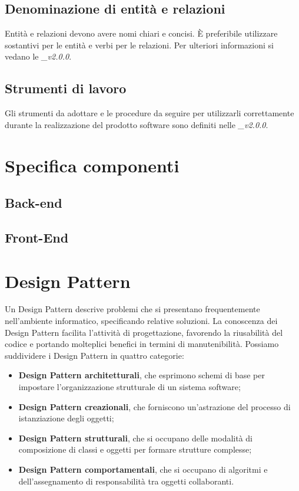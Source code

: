 \documentclass[12pt,a4paper]{article}
\begin{document}

\subsection{Denominazione di entità e relazioni}
Entità e relazioni devono avere nomi chiari e concisi. È preferibile utilizzare sostantivi
per le entità e verbi per le relazioni. Per ulteriori informazioni si vedano
le \textit{\NdP\_v2.0.0}.

\subsection{Strumenti di lavoro}
Gli strumenti da adottare e le procedure da seguire per utilizzarli correttamente durante la realizzazione 
del prodotto software sono definiti nelle \textit{\NdP\_v2.0.0}.

\newpage
\section{Specifica componenti}

\subsection{Back-end}

\subsection{Front-End}

\newpage
\section{Design Pattern}
Un Design Pattern descrive problemi che si presentano frequentemente nell'ambiente informatico, specificando relative soluzioni. La conoscenza dei Design Pattern facilita l’attività di progettazione, favorendo la riusabilità del codice e portando molteplici benefici in termini di manutenibilità. Possiamo suddividere i Design Pattern in
quattro categorie:
\begin{itemize}
	\item \textbf{Design Pattern architetturali}, che esprimono schemi di base per impostare l’organizzazione strutturale di un sistema software;
	\item \textbf{Design Pattern creazionali}, che forniscono un’astrazione del processo di istanziazione degli oggetti;
	\item \textbf{Design Pattern strutturali}, che si occupano delle modalità di composizione di classi e oggetti per formare strutture complesse;
	\item \textbf{Design Pattern comportamentali}, che si occupano di algoritmi e dell’assegnamento	di responsabilità tra oggetti collaboranti.
\end{itemize}
\end{document}
